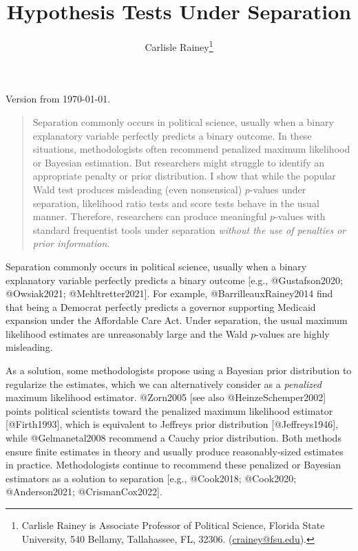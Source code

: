 \documentclass[
]{article}
\title{Hypothesis Tests Under Separation}
\author{Carlisle Rainey\footnote{Carlisle Rainey is Associate Professor
  of Political Science, Florida State University, 540 Bellamy,
  Tallahassee, FL, 32306.
  (\href{mailto:crainey@fsu.edu}{crainey@fsu.edu}).}}
\date{}
\begin{document}
\maketitle

\begin{center}
Version from \today.
\end{center}

\singlespace

\begin{quote}
Separation commonly occurs in political science, usually when a binary explanatory variable perfectly predicts a binary outcome. In these situations, methodologists often recommend penalized maximum likelihood or Bayesian estimation. But researchers might struggle to identify an appropriate penalty or prior distribution. I show that while the popular Wald test produces misleading (even nonsensical) $p$-values under separation, likelihood ratio tests and score tests behave in the usual manner. Therefore, researchers can produce meaningful $p$-values with standard frequentist tools under separation \textit{without the use of penalties or prior information}.
\end{quote}

\newpage
\onehalfspace

Separation commonly occurs in political science, usually when a binary
explanatory variable perfectly predicts a binary outcome {[}e.g.,
@Gustafson2020; @Owsiak2021; @Mehltretter2021{]}. For example,
@BarrilleauxRainey2014 find that being a Democrat perfectly predicts a
governor supporting Medicaid expansion under the Affordable Care Act.
Under separation, the usual maximum likelihood estimates are
unreasonably large and the Wald \(p\)-values are highly misleading.

As a solution, some methodologists propose using a Bayesian prior
distribution to regularize the estimates, which we can alternatively
consider as a \emph{penalized} maximum likelihood estimator. @Zorn2005
{[}see also @HeinzeSchemper2002{]} points political scientists toward
the penalized maximum likelihood estimator {[}@Firth1993{]}, which is
equivalent to Jeffreys prior distribution {[}@Jeffreys1946{]}, while
@Gelmanetal2008 recommend a Cauchy prior distribution. Both methods
ensure finite estimates in theory and usually produce reasonably-sized
estimates in practice. Methodologists continue to recommend these
penalized or Bayesian estimators as a solution to separation {[}e.g.,
@Cook2018; @Cook2020; @Anderson2021; @CrismanCox2022{]}.
\end{document}
